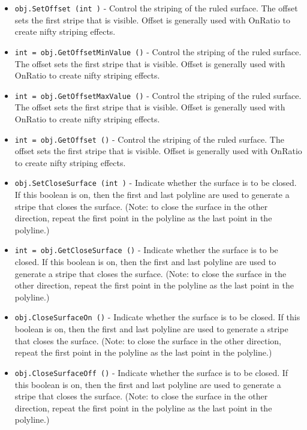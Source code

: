 \begin{itemize}
\item  \verb|obj.SetOffset (int )| -  Control the striping of the ruled surface. The offset sets the
 first stripe that is visible. Offset is generally used with
 OnRatio to create nifty striping effects.

\item  \verb|int = obj.GetOffsetMinValue ()| -  Control the striping of the ruled surface. The offset sets the
 first stripe that is visible. Offset is generally used with
 OnRatio to create nifty striping effects.

\item  \verb|int = obj.GetOffsetMaxValue ()| -  Control the striping of the ruled surface. The offset sets the
 first stripe that is visible. Offset is generally used with
 OnRatio to create nifty striping effects.

\item  \verb|int = obj.GetOffset ()| -  Control the striping of the ruled surface. The offset sets the
 first stripe that is visible. Offset is generally used with
 OnRatio to create nifty striping effects.

\item  \verb|obj.SetCloseSurface (int )| -  Indicate whether the surface is to be closed. If this boolean is
 on, then the first and last polyline are used to generate a stripe
 that closes the surface. (Note: to close the surface in the other
 direction, repeat the first point in the polyline as the last
 point in the polyline.)

\item  \verb|int = obj.GetCloseSurface ()| -  Indicate whether the surface is to be closed. If this boolean is
 on, then the first and last polyline are used to generate a stripe
 that closes the surface. (Note: to close the surface in the other
 direction, repeat the first point in the polyline as the last
 point in the polyline.)

\item  \verb|obj.CloseSurfaceOn ()| -  Indicate whether the surface is to be closed. If this boolean is
 on, then the first and last polyline are used to generate a stripe
 that closes the surface. (Note: to close the surface in the other
 direction, repeat the first point in the polyline as the last
 point in the polyline.)

\item  \verb|obj.CloseSurfaceOff ()| -  Indicate whether the surface is to be closed. If this boolean is
 on, then the first and last polyline are used to generate a stripe
 that closes the surface. (Note: to close the surface in the other
 direction, repeat the first point in the polyline as the last
 point in the polyline.)


\end{itemize}

